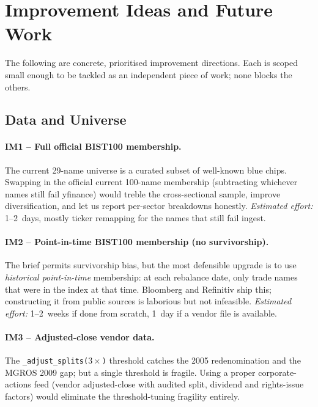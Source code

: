 \documentclass[11pt,a4paper]{article}
\begin{document}
\section{Improvement Ideas and Future Work}

The following are concrete, prioritised improvement directions. Each is scoped
small enough to be tackled as an independent piece of work; none blocks the
others.

\subsection{Data and Universe}

\paragraph{IM1 -- Full official BIST100 membership.} The current 29-name
universe is a curated subset of well-known blue chips. Swapping in the
official current 100-name membership (subtracting whichever names still fail
yfinance) would treble the cross-sectional sample, improve diversification,
and let us report per-sector breakdowns honestly. \emph{Estimated effort:}
1--2~days, mostly ticker remapping for the names that still fail ingest.

\paragraph{IM2 -- Point-in-time BIST100 membership (no survivorship).} The
brief permits survivorship bias, but the most defensible upgrade is to use
\emph{historical point-in-time} membership: at each rebalance date, only
trade names that were in the index at that time. Bloomberg and Refinitiv ship
this; constructing it from public sources is laborious but not infeasible.
\emph{Estimated effort:} 1--2~weeks if done from scratch, 1~day if a vendor
file is available.

\paragraph{IM3 -- Adjusted-close vendor data.} The
\texttt{\_adjust\_splits($3\times$)} threshold catches the 2005 redenomination
and the MGROS 2009 gap; but a single threshold is fragile. Using a
proper corporate-actions feed (vendor adjusted-close with audited split,
dividend and rights-issue factors) would eliminate the threshold-tuning
fragility entirely.
\end{document}
